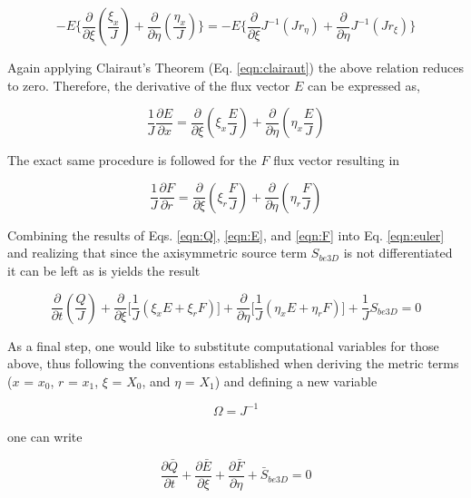 \begin{displaymath}
	-E \Big\{\frac{\partial}{\partial \xi}(\frac{\xi_x}{J})
	+ \frac{\partial}{\partial \eta}(\frac{\eta_x}{J})\Big\} = 
	-E \Big\{\frac{\partial}{\partial \xi}J^{-1}(J r_\eta)
	+ \frac{\partial}{\partial \eta}J^{-1}(J r_\xi)\Big\}
\end{displaymath}

	Again applying Clairaut's Theorem (Eq. \ref{eqn:clairaut}) the above relation reduces to zero.  Therefore, the
derivative of the flux vector $E$ can be expressed as,

\begin{equation}
	\frac{1}{J}\frac{\partial E}{\partial x} = 
	\frac{\partial}{\partial \xi} (\xi_x \frac{E}{J})
	+ \frac{\partial}{\partial \eta} (\eta_x \frac{E}{J}) 
\label{eqn:E}
\end{equation}

	The exact same procedure is followed for the $F$ flux vector resulting in

\begin{equation}
	\frac{1}{J}\frac{\partial F}{\partial r} = 
	\frac{\partial}{\partial \xi} (\xi_r \frac{F}{J})
	+ \frac{\partial}{\partial \eta} (\eta_r \frac{F}{J}) 
\label{eqn:F}
\end{equation}

	Combining the results of Eqs. \ref{eqn:Q}, \ref{eqn:E}, and \ref{eqn:F} into Eq. \ref{eqn:euler} and
realizing that since the axisymmetric source term $S_{be3D}$ is not differentiated it can be left as is yields the
result

\begin{displaymath}
	\frac{\partial}{\partial t}(\frac{Q}{J}) + \frac{\partial}{\partial \xi} \Big[\frac{1}{J}(\xi_x E
	+ \xi_r F)\Big] + \frac{\partial}{\partial \eta}\Big[\frac{1}{J} (\eta_x E 
	+ \eta_r F)\Big] + \frac{1}{J}S_{be3D} = 0
\end{displaymath}

	As a final step, one would like to substitute computational variables for those above, thus following the
conventions established when deriving the metric terms ($x$ = $x_0$, $r$ = $x_1$, $\xi$ = $X_0$, and $\eta$ = $X_1$)
and defining a new variable 

\begin{equation}
	\Omega = J^{-1}
\label{eqn:omega}
\end{equation} 

	one can write

\begin{equation}
	\frac{\partial \bar{Q}}{\partial t} + \frac{\partial \bar{E}}{\partial \xi} 
	+ \frac{\partial \bar{F}}{\partial \eta} + \bar{S}_{be3D} = 0	
\label{eqn:eulerbar}
\end{equation}

